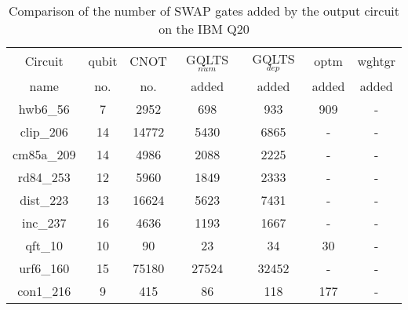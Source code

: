 \documentclass[runningheads]{llncs}
\begin{document}
				\begin{table}[H]
					\label{tab5}
					\begin{center}  
					\begin{tabular}{|c|c|c|c|c|c|c|}
					\hline
					Circuit &  qubit  & CNOT &GQLTS$_{num}$& GQLTS$_{dep}$  & optm 	 & wghtgr 	\\
					 name	&   no. 	&	no. & added&  added &  added 	&  added\\
					\hline
					hwb6\_56 & 7 & 2952 & 698 & 933 & 909 & - \\ 
clip\_206 & 14 & 14772 & 5430 & 6865 & - & - \\ 
cm85a\_209 & 14 & 4986 & 2088 & 2225 & - & - \\ 
rd84\_253 & 12 & 5960 & 1849 & 2333 & - & - \\ 
dist\_223 & 13 & 16624 & 5623 & 7431 & - & - \\ 
inc\_237 & 16 & 4636 & 1193 & 1667 & - & - \\ 
qft\_10 & 10 & 90 & 23 & 34 & 30 & - \\ 
urf6\_160 & 15 & 75180 & 27524 & 32452 & - & - \\ 
con1\_216 & 9 & 415 & 86 & 118 & 177 & - \\ 
					\hline
					\end{tabular} 
					\end{center}	
					\caption{Comparison of  the number of  SWAP gates added by the 
					output circuit on the IBM Q20 }  
					\label{tab5}
					\end{table}
\end{document}
